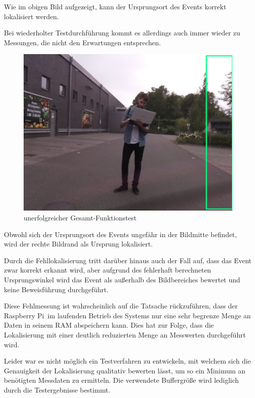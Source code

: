 Wie im obigen Bild aufgezeigt, kann der Ursprungsort des Events korrekt lokalisiert werden. 

Bei wiederholter Testdurchführung kommt es allerdings auch immer wieder zu Messungen, die nicht den Erwartungen entsprechen.

\begin{figure}[!h]
	\begin{center}
		\includegraphics[scale=0.2]{Sections/Tests/Test_8}
	\end{center}
	\caption{unerfolgreicher Gesamt-Funktionstest}
	\label{fig:Test_8}
\end{figure}

Obwohl sich der Ursprungsort des Events ungefähr in der Bildmitte befindet, wird der rechte Bildrand als Ursprung lokalisiert. 

Durch die Fehllokalisierung tritt darüber hinaus auch der Fall auf, dass das Event zwar korrekt erkannt wird, aber aufgrund des fehlerhaft berechneten Ursprungswinkel wird das Event als außerhalb des Bildbereiches bewertet und keine Beweisführung durchgeführt. 

Diese Fehlmessung ist wahrscheinlich auf die Tatsache rückzuführen, dass der \glqq Raspberry Pi\grqq\ im laufenden Betrieb des Systems nur eine sehr begrenze Menge an Daten in seinem RAM abspeichern kann. Dies hat zur Folge, dass die Lokalisierung mit einer deutlich reduzierten Menge an Messwerten durchgeführt wird. 

Leider war es nicht möglich ein Testverfahren zu entwickeln, mit welchem sich die Genauigkeit der Lokalisierung qualitativ bewerten lässt, um so ein Minimum an benötigten Messdaten zu ermitteln. Die verwendete Buffergröße wird lediglich durch die Testergebnisse bestimmt.

